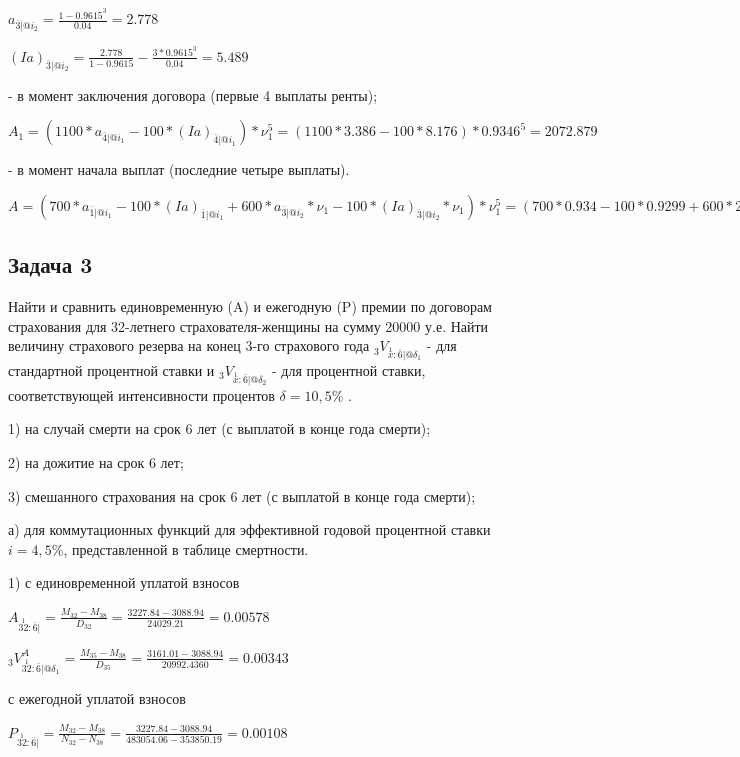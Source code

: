 \documentclass[12pt,a4paper, oneside]{extreport}
\begin{document}
$a_{\bar{3}|@i_2} = \frac{1-0.9615^3}{0.04}=2.778$

$(Ia)_{\bar{3}|@i_2} = \frac{2.778}{1-0.9615}-\frac{3*0.9615^3}{0.04}=5.489$


- в момент заключения договора (первые 4 выплаты ренты);

$A_1 = (1100 * a_{\bar{4}|@i_1} - 100 * (Ia)_{\bar{4}|@i_1}  )*\nu_1^5 = (1100 * 3.386 - 100 * 8.176  )*0.9346^5
 =2072.879
 $  

- в момент начала выплат (последние четыре выплаты).

$A = (700 * a_{\bar{1}|@i_1} - 100 * (Ia)_{\bar{1}|@i_1}     +  600 * a_{\bar{3}|@i_2} * \nu_1   - 100 * (Ia)_{\bar{3}|@i_2}* \nu_1  )*\nu_1^5 = (700 * 0.934 - 100 * 0.9299     +  600 * 2.778 * 0.9346   - 100 * 5.489* 0.9346  )*0.9346^5 = 1144.896
$  




\subsection*{Задача 3}

Найти и сравнить единовременную (A) и ежегодную (P) премии по договорам
страхования для 32-летнего страхователя-женщины на сумму 20000 у.е. Найти величину страхового резерва на конец 3-го страхового года  $_3V_{  \overset{1}{x} : \bar{6}|@\delta_1}$  - 
для  стандартной процентной ставки  и  $_3V_{  \overset{1}{x} : \bar{6}|@\delta_2}$ - для процентной ставки, 
соответствующей интенсивности процентов $\delta=10,5\%$ .


1) на случай смерти на срок 6 лет (с выплатой в конце года смерти);

2) на дожитие на срок 6 лет;

3) смешанного страхования на срок 6 лет (с выплатой в конце года смерти);

а) для коммутационных функций для эффективной годовой процентной ставки $i=4,5\%$, представленной в таблице смертности.

1) с единовременной уплатой взносов

 $ A_{  \overset{1}{32} : \bar{6}|} = \frac{M_{32}-M_{38}}{D_{32}} = \frac{3227.84-3088.94}{24029.21} = 0.00578$

$_3V_{  \overset{1}{32} : \bar{6}|@\delta_1}^A = \frac{M_{35}-M_{38}}{D_{35}} = \frac{3161.01-3088.94}{20992.4360} = 0.00343  $


с ежегодной уплатой взносов

 $ P_{ \overset{1}{32} : \bar{6}|} = \frac{M_{32}-M_{38}}{N_{32}-N_{38}} = \frac{3227.84 -3088.94}{483054.06- 353850.19} = 0.00108$
\end{document}
